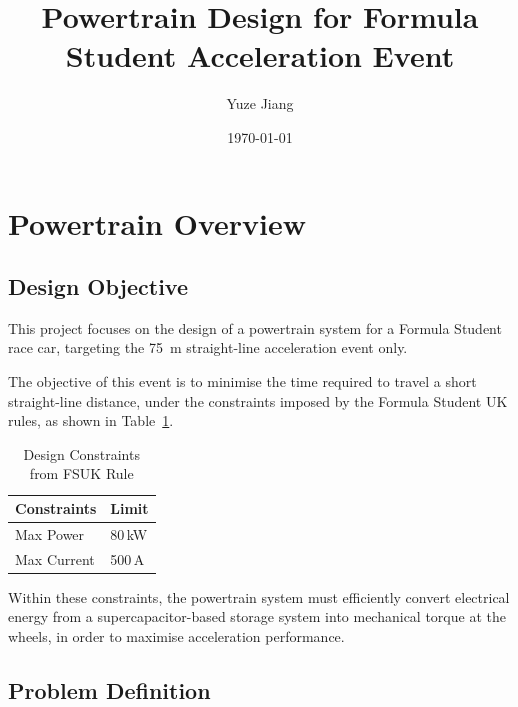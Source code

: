 \documentclass[11pt, a4paper]{report}
\title{Powertrain Design for Formula Student Acceleration Event}
\author{Yuze Jiang}
\date{\today}
\numberwithin{equation}{section}
\begin{document}

\maketitle

\newpage

\setcounter{page}{1}

\tableofcontents
\newpage


\section{Powertrain Overview}

\subsection{Design Objective}

This project focuses on the design of a powertrain system for a Formula Student race car, targeting the \SI{75}{\meter} straight-line acceleration event only.

The objective of this event is to minimise the time required to travel a short straight-line distance, under the constraints imposed by the Formula Student UK rules, as shown in Table~\ref{tab:FSUK_constraints}.

\begin{table}[H]
\centering
\small

\caption{Design Constraints from FSUK Rule\cite{fs-ev-rules2026}}
\label{tab:FSUK_constraints}

\begin{tabular}{ll}
\toprule
\textbf{Constraints} & \textbf{Limit} \\
\midrule
Max Power & 80\,kW \\
Max Current & 500\,A \\
\bottomrule
\end{tabular}
\end{table}

Within these constraints, the powertrain system must efficiently convert electrical energy from a supercapacitor-based storage system into mechanical torque at the wheels, in order to maximise acceleration performance.

\subsection{Problem Definition}
\end{document}
